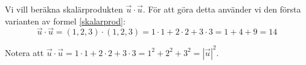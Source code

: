 \documentclass[../main.tex]{subfiles}
\begin{document}
\begin{solution}{3}
Vi vill beräkna skalärprodukten $\Vec{u}\cdot\Vec{u}$. För att göra detta använder vi den första varianten av formel \ref{skalarprod}:
\[
\Vec{u}\cdot\Vec{u} = (1, 2, 3) \cdot (1, 2, 3) = 1\cdot1 + 2\cdot2 + 3\cdot3 = 1 + 4 + 9 = 14
\]

Notera att \(\Vec{u}\cdot\Vec{u} = 1\cdot1 + 2\cdot2 + 3\cdot3 = 1^2 + 2^2 + 3^2 = |\vec{u}|^2\). 


\end{solution}
\end{document}
